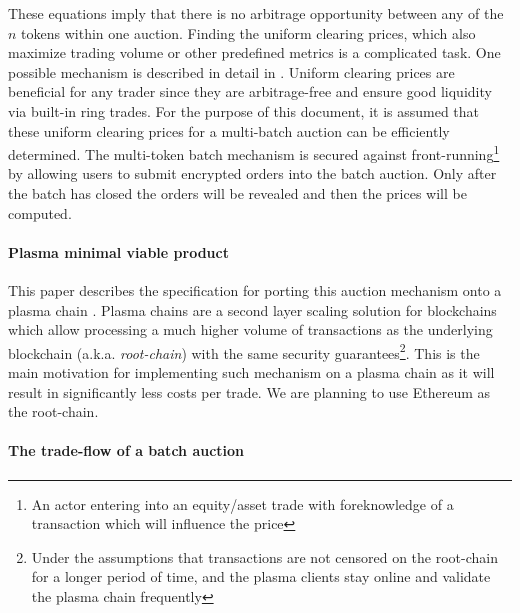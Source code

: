 \documentclass[11pt,parskip=full]{scrartcl}%
\begin{document}
These equations imply that there is no arbitrage opportunity between any of the $n$ tokens within one auction.
Finding the uniform clearing prices, which also maximize trading volume or other predefined metrics is a complicated task. One possible mechanism is described in detail in \cite{priceOptimization}. Uniform clearing prices are beneficial for any trader since they are arbitrage-free and ensure good liquidity via built-in ring trades. For the purpose of this document, it is assumed that these uniform clearing prices for a multi-batch auction can be efficiently determined. \newline
The multi-token batch mechanism is secured against front-running\footnote{An actor entering into an equity/asset trade with foreknowledge of a transaction which will influence the price} by allowing users to submit encrypted orders into the batch auction. Only after the batch has closed the orders will be revealed and then the prices will be computed. 


\paragraph{Plasma minimal viable product}

This paper describes the specification for porting this auction mechanism onto a plasma chain \cite{plasma}. Plasma chains are a second layer scaling solution for blockchains which allow processing a much higher volume of transactions as the underlying blockchain (a.k.a. \emph{root-chain}) with the same security guarantees\footnote{Under the assumptions that transactions are not censored on the root-chain for a longer period of time, and the plasma clients stay online and validate the plasma chain frequently}. This is the main motivation for implementing such mechanism on a plasma chain as it will result in significantly less costs per trade. We are planning to use Ethereum as the root-chain. 

\paragraph{The trade-flow of a batch auction}  
\end{document}
